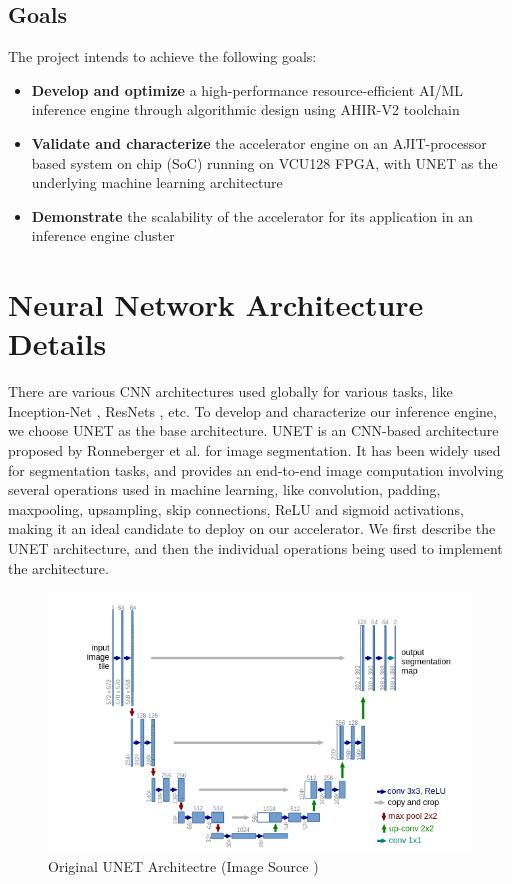 \documentclass[a4paper,12pt, final]{report}
\begin{document}
\section{Goals}

The project intends to achieve the following goals:

\begin{itemize}

	\item {\bf Develop and optimize} a high-performance resource-efficient AI/ML inference engine through algorithmic design using AHIR-V2 toolchain
	\item {\bf Validate and characterize} the accelerator engine on an AJIT-processor based system on chip (SoC) running on VCU128 FPGA, with UNET as the underlying machine learning architecture
	\item {\bf Demonstrate} the scalability of the accelerator for its application in an inference engine cluster
\end{itemize}

\chapter{Neural Network Architecture Details}\label{Chap:2}

There are various CNN architectures used globally for various tasks, like Inception-Net \cite{GoogleNet}, ResNets \cite{ResNet},  etc. To develop and characterize our inference engine, we choose UNET as the base architecture. UNET is an CNN-based architecture proposed by Ronneberger et al. for image segmentation\cite{UNET}. It has been widely used for segmentation tasks, and provides an end-to-end image computation involving several operations used in machine learning, like convolution, padding, maxpooling, upsampling, skip connections, ReLU and sigmoid activations, making it an ideal candidate to deploy on our accelerator. We first describe the UNET architecture, and then the individual operations being used to implement the architecture.
\\

\begin{figure}[h!]
    \centering
    \includegraphics[width=\textwidth]{Screenshot from 2022-10-12 10-40-59.png}
	\caption{Original UNET Architectre (Image Source \cite{UNET})}
    \label{fig:UNET}
\end{figure}
\end{document}
